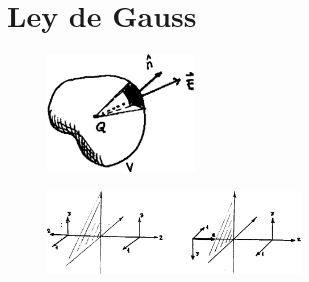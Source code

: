 \documentclass[10pt,oneside]{CBFT_book}
\begin{document}
\section{Ley de Gauss}

\begin{figure}[htb]
	\begin{center}
	\includegraphics[width=0.35\textwidth]{images/fig_ft1_gauss.pdf}	 
	\end{center}
	\caption{}
\end{figure} 


\begin{figure}[htb]
	\begin{center}
	\includegraphics[width=0.6\textwidth]{images/fig_ft1_reflexvect.pdf}	 
	\end{center}
	\caption{}
\end{figure} 

\end{document}
